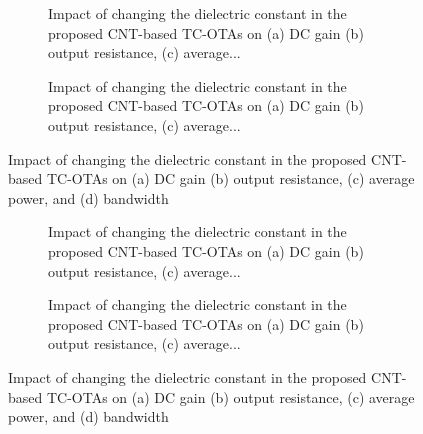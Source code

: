 \begin{figure}[htbp]
  \centering
  \begin{subfigure}[b]{0.48\linewidth}
    \centering
    \caption{Impact of changing the dielectric constant in the proposed CNT-based TC-OTAs on (a) DC gain (b) output resistance, (c) average...}

  \end{subfigure}
  \hfill
  \begin{subfigure}[b]{0.48\linewidth}
    \centering
    \caption{Impact of changing the dielectric constant in the proposed CNT-based TC-OTAs on (a) DC gain (b) output resistance, (c) average...}

  \end{subfigure}
  \caption{Impact of changing the dielectric constant in the proposed CNT-based TC-OTAs on (a) DC gain (b) output resistance, (c) average power, and (d) bandwidth}

  \label{fig:group_l0kdd}
\end{figure}

\begin{figure}[htbp]
  \centering
  \begin{subfigure}[b]{0.48\linewidth}
    \centering
    \caption{Impact of changing the dielectric constant in the proposed CNT-based TC-OTAs on (a) DC gain (b) output resistance, (c) average...}

  \end{subfigure}
  \hfill
  \begin{subfigure}[b]{0.48\linewidth}
    \centering
    \caption{Impact of changing the dielectric constant in the proposed CNT-based TC-OTAs on (a) DC gain (b) output resistance, (c) average...}

  \end{subfigure}
  \caption{Impact of changing the dielectric constant in the proposed CNT-based TC-OTAs on (a) DC gain (b) output resistance, (c) average power, and (d) bandwidth}

  \label{fig:group_nhq1o}
\end{figure}

